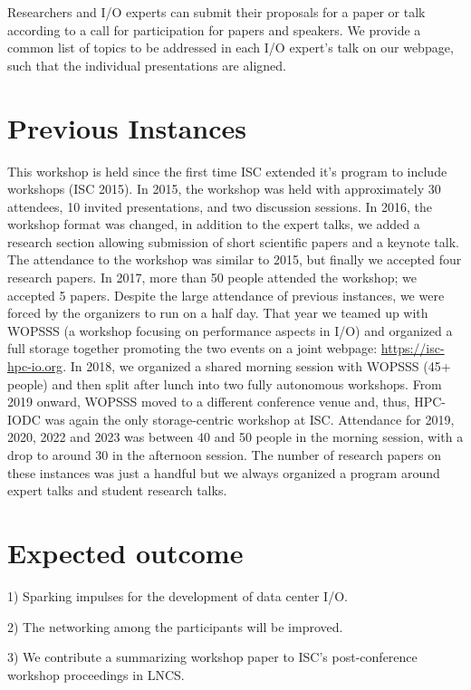 \documentclass[a4paper,10pt]{article}
\begin{document}
Researchers and I/O experts can submit their proposals for a paper or talk according to a call for participation for papers and speakers.
We provide a common list of topics to be addressed in each I/O expert's talk on our webpage, such that the individual presentations are aligned.



\section{Previous Instances}

This workshop is held since the first time ISC extended it's program to include workshops (ISC 2015).
In 2015, the workshop was held with approximately 30 attendees, 10 invited presentations, and two discussion sessions.
In 2016, the workshop format was changed, in addition to the expert talks, we added a research section allowing submission of short scientific papers and a keynote talk.
The attendance to the workshop was similar to 2015, but finally we accepted four research papers.
In 2017, more than 50 people attended the workshop; we accepted 5 papers. %
Despite the large attendance of previous instances, we were forced by the organizers to run on a half day.
That year we teamed up with WOPSSS (a workshop focusing on performance aspects in I/O) and organized a full storage together promoting the two events on a joint webpage: \url{https://isc-hpc-io.org}.
In 2018, we organized a shared morning session with WOPSSS (45+ people) and then split after lunch into two fully autonomous workshops.
From 2019 onward, WOPSSS moved to a different conference venue and, thus, HPC-IODC was again the only storage-centric workshop at ISC.
Attendance for 2019, 2020, 2022 and 2023 was between 40 and 50 people in the morning session, with a drop to around 30 in the afternoon session.
The number of research papers on these instances was just a handful but we always organized a program around expert talks and student research talks.

\section{Expected outcome}
1) Sparking impulses for the development of data center I/O.

2) The networking among the participants will be improved.

3) We contribute a summarizing workshop paper to ISC's post-conference workshop proceedings in LNCS.
\end{document}
